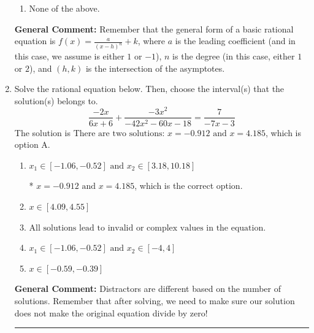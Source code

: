 \documentclass{extbook}[14pt]
\newcommand{\litem}[1]{\item #1

\rule{\textwidth}{0.4pt}}
\begin{document}
\begin{enumerate}
{\begin{enumerate}[label=\Alph*.]
\item None of the above.\end{enumerate}
\textbf{General Comment:} Remember that the general form of a basic rational equation is $ f(x) = \frac{a}{(x-h)^n} + k$, where $a$ is the leading coefficient (and in this case, we assume is either $1$ or $-1$), $n$ is the degree (in this case, either $1$ or $2$), and $(h, k)$ is the intersection of the asymptotes.
}
\litem{
Solve the rational equation below. Then, choose the interval(s) that the solution(s) belongs to.
\[ \frac{-2x}{6x + 6} + \frac{-3x^{2}}{-42x^{2} -60 x -18} = \frac{7}{-7x -3} \]The solution is \( \text{There are two solutions: } x = -0.912 \text{ and } x = 4.185 \), which is option A.\begin{enumerate}[label=\Alph*.]
\item \( x_1 \in [-1.06, -0.52] \text{ and } x_2 \in [3.18,10.18] \)

* $x = -0.912 \text{ and } x = 4.185$, which is the correct option.
\item \( x \in [4.09,4.55] \)


\item \( \text{All solutions lead to invalid or complex values in the equation.} \)


\item \( x_1 \in [-1.06, -0.52] \text{ and } x_2 \in [-4,4] \)


\item \( x \in [-0.59,-0.39] \)


\end{enumerate}

\textbf{General Comment:} Distractors are different based on the number of solutions. Remember that after solving, we need to make sure our solution does not make the original equation divide by zero!
}
\end{enumerate}
\end{document}
